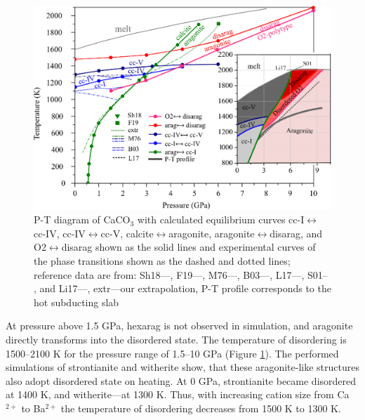 \documentclass[journal=jacsat,manuscript=article]{achemso}
\begin{document}
\begin{figure}[H]
\includegraphics[width=\textwidth]{phdia} \centering
\caption{P-T diagram of CaCO$_3$ with calculated equilibrium curves cc-I$\leftrightarrow$cc-IV, cc-IV$\leftrightarrow$cc-V,  calcite$\leftrightarrow$aragonite, aragonite$\leftrightarrow$disarag, and O2$\leftrightarrow$disarag shown as the solid lines and experimental curves of the phase transitions shown as the dashed and dotted lines; reference data are from: Sh18---\cite{shatskiy2018}, F19---\cite{fedoraeva2019}, M76---\cite{mirwald1976}, B03---\cite{bagdassarov2003}, L17---\cite{litasov2017}, S01-- \cite{suito2001}, and Li17---\cite{li2017}, extr---our extrapolation, P-T profile corresponds to the hot subducting slab \cite{syracuse2010} } \label{phdia}
\end{figure}


At pressure above 1.5 GPa, hexarag is not observed in simulation, and aragonite directly transforms into the disordered state. 
The temperature of disordering is 1500--2100 K for the pressure range of 1.5--10 GPa (Figure \ref{phdia}). 
The performed simulations of strontianite and witherite show, that these aragonite-like structures also adopt disordered state on heating. 
At 0 GPa, strontianite became disordered at 1400 K, and witherite---at 1300 K. 
Thus, with increasing cation size from Ca$^{2+}$ to Ba$^{2+}$ the temperature of disordering decreases from 1500 K to 1300 K. 
\end{document}
